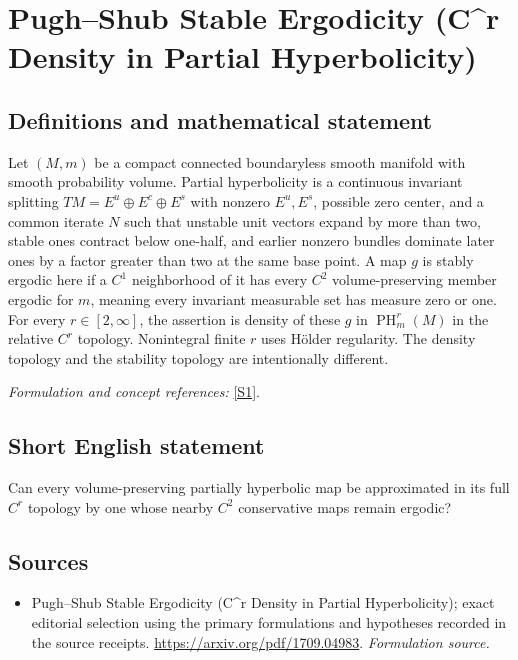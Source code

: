 \documentclass[11pt]{article}
\begin{document}
\section*{\texorpdfstring{Pugh–Shub Stable Ergodicity (C\textasciicircum{}r Density in Partial Hyperbolicity)}{Pugh–Shub Stable Ergodicity (C\textasciicircum{}r Density in Partial Hyperbolicity)}}\label{388}
\subsection{Definitions and mathematical statement}
Let $(M,m)$ be a compact connected boundaryless smooth manifold with smooth probability volume. Partial hyperbolicity is a continuous invariant splitting $TM=E^u\oplus E^c\oplus E^s$ with nonzero $E^u,E^s$, possible zero center, and a common iterate $N$ such that unstable unit vectors expand by more than two, stable ones contract below one-half, and earlier nonzero bundles dominate later ones by a factor greater than two at the same base point. A map $g$ is stably ergodic here if a $C^1$ neighborhood of it has every $C^2$ volume-preserving member ergodic for $m$, meaning every invariant measurable set has measure zero or one. For every $r\in[2,\infty]$, the assertion is density of these $g$ in $\operatorname{PH}_m^r(M)$ in the relative $C^r$ topology. Nonintegral finite $r$ uses H\"older regularity. The density topology and the stability topology are intentionally different.
\par\smallskip\textit{Formulation and concept references:} \href{https://arxiv.org/pdf/1709.04983}{[S1]}.

\subsection{Short English statement}
Can every volume-preserving partially hyperbolic map be approximated in its full $C^r$ topology by one whose nearby $C^2$ conservative maps remain ergodic?
\subsection{Sources}
\begin{itemize}
\item[S1]Pugh–Shub Stable Ergodicity (C\textasciicircum{}r Density in Partial Hyperbolicity); exact editorial selection using the primary formulations and hypotheses recorded in the source receipts.
\url{https://arxiv.org/pdf/1709.04983}.
\textit{Formulation source.}
\end{itemize}
\end{document}
